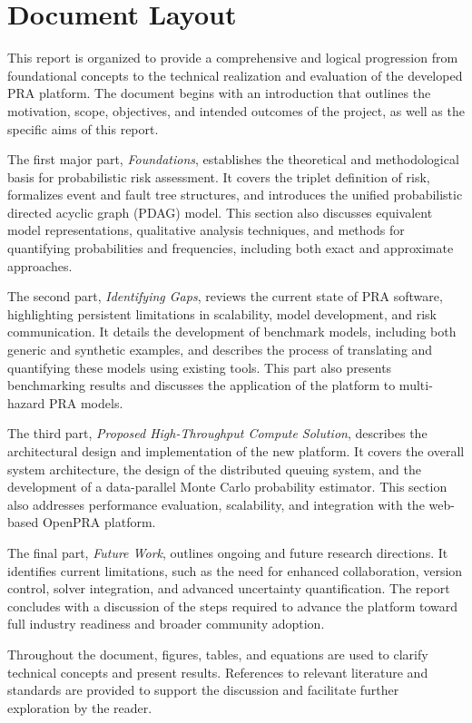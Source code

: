 \section{Document Layout}
This report is organized to provide a comprehensive and logical progression from foundational concepts to the technical realization and evaluation of the developed PRA platform. The document begins with an introduction that outlines the motivation, scope, objectives, and intended outcomes of the project, as well as the specific aims of this report.

The first major part, \textit{Foundations}, establishes the theoretical and methodological basis for probabilistic risk assessment. It covers the triplet definition of risk, formalizes event and fault tree structures, and introduces the unified probabilistic directed acyclic graph (PDAG) model. This section also discusses equivalent model representations, qualitative analysis techniques, and methods for quantifying probabilities and frequencies, including both exact and approximate approaches.

The second part, \textit{Identifying Gaps}, reviews the current state of PRA software, highlighting persistent limitations in scalability, model development, and risk communication. It details the development of benchmark models, including both generic and synthetic examples, and describes the process of translating and quantifying these models using existing tools. This part also presents benchmarking results and discusses the application of the platform to multi-hazard PRA models.

The third part, \textit{Proposed High-Throughput Compute Solution}, describes the architectural design and implementation of the new platform. It covers the overall system architecture, the design of the distributed queuing system, and the development of a data-parallel Monte Carlo probability estimator. This section also addresses performance evaluation, scalability, and integration with the web-based OpenPRA platform.

The final part, \textit{Future Work}, outlines ongoing and future research directions. It identifies current limitations, such as the need for enhanced collaboration, version control, solver integration, and advanced uncertainty quantification. The report concludes with a discussion of the steps required to advance the platform toward full industry readiness and broader community adoption.

Throughout the document, figures, tables, and equations are used to clarify technical concepts and present results. References to relevant literature and standards are provided to support the discussion and facilitate further exploration by the reader.
